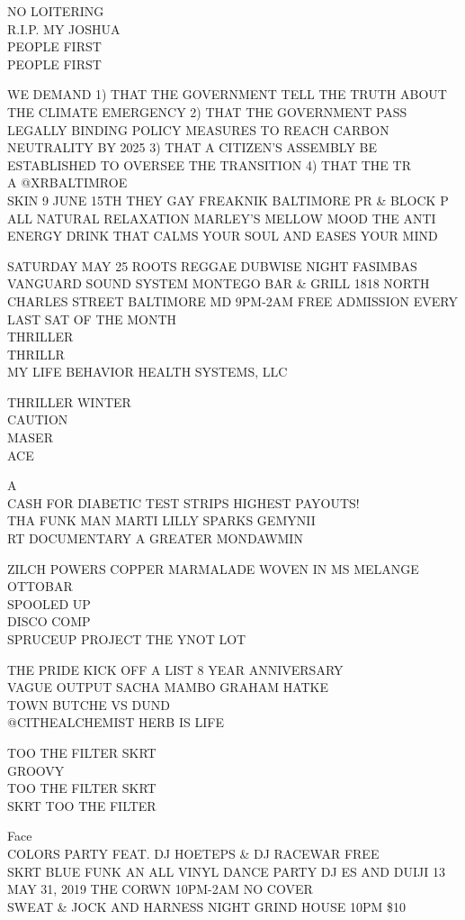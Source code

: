\documentclass[10pt,letterpaper]{article}
\begin{document}
NO LOITERING\\
R.I.P. MY JOSHUA\\
PEOPLE FIRST\\
PEOPLE FIRST

WE DEMAND 1) THAT THE GOVERNMENT TELL THE TRUTH ABOUT THE CLIMATE EMERGENCY 2) THAT THE GOVERNMENT PASS LEGALLY BINDING POLICY MEASURES TO REACH CARBON NEUTRALITY BY 2025 3) THAT A CITIZEN'S ASSEMBLY BE ESTABLISHED TO OVERSEE THE TRANSITION 4) THAT THE TR\\
A @XRBALTIMROE\\
SKIN 9 JUNE 15TH THEY GAY FREAKNIK BALTIMORE PR \& BLOCK P\\
ALL NATURAL RELAXATION MARLEY'S MELLOW MOOD THE ANTI ENERGY DRINK THAT CALMS YOUR SOUL AND EASES YOUR MIND

SATURDAY MAY 25 ROOTS REGGAE DUBWISE NIGHT FASIMBAS VANGUARD SOUND SYSTEM MONTEGO BAR \& GRILL 1818 NORTH CHARLES STREET BALTIMORE MD 9PM{-}2AM FREE ADMISSION EVERY LAST SAT OF THE MONTH\\
THRILLER\\
THRILLR\\
MY LIFE BEHAVIOR HEALTH SYSTEMS, LLC

THRILLER WINTER\\
CAUTION\\
MASER\\
ACE

A\\
CASH FOR DIABETIC TEST STRIPS HIGHEST PAYOUTS!\\
THA FUNK MAN MARTI LILLY SPARKS GEMYNII\\
RT DOCUMENTARY A GREATER MONDAWMIN

ZILCH POWERS COPPER MARMALADE WOVEN IN MS MELANGE OTTOBAR\\
SPOOLED UP\\
DISCO COMP\\
SPRUCEUP PROJECT THE YNOT LOT

THE PRIDE KICK OFF A LIST 8 YEAR ANNIVERSARY\\
VAGUE OUTPUT SACHA MAMBO GRAHAM HATKE\\
TOWN BUTCHE VS DUND\\
@CITHEALCHEMIST HERB IS LIFE

TOO THE FILTER SKRT\\
GROOVY\\
TOO THE FILTER SKRT\\
SKRT TOO THE FILTER

Face\\
COLORS PARTY FEAT. DJ HOETEPS \& DJ RACEWAR FREE\\
SKRT BLUE FUNK AN ALL VINYL DANCE PARTY DJ ES AND DUIJI 13 MAY 31, 2019 THE CORWN 10PM{-}2AM NO COVER\\
SWEAT \& JOCK AND HARNESS NIGHT GRIND HOUSE 10PM \$10
\end{document}
